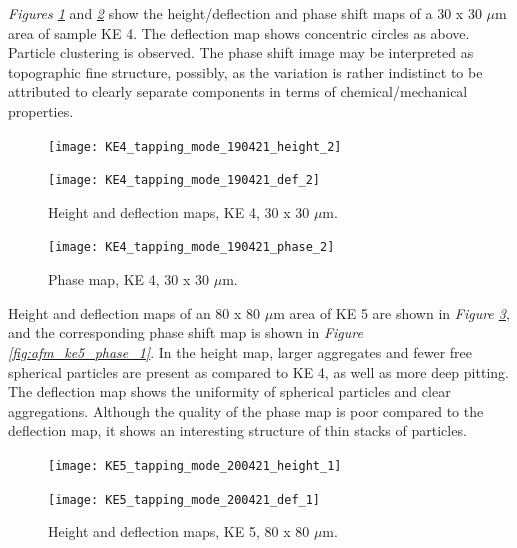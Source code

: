 \textit{Figures \ref{fig:afm_ke4_height_def_3}} and \textit{\ref{fig:afm_ke4_phase_3}} show the height/deflection and phase shift maps of a 30 x 30 $\mu$m area of sample KE 4. The deflection map shows concentric circles as above. Particle clustering is observed. The phase shift image may be interpreted as topographic fine structure, possibly, as the variation is rather indistinct to be attributed to clearly separate components in terms of chemical/mechanical properties.

\begin{figure}[H]
\centering
\begin{minipage}{.45\textwidth}
  \centering
  \texttt{[image: KE4\_tapping\_mode\_190421\_height\_2]}
\end{minipage}
\begin{minipage}{.45\textwidth}
  \centering
  \texttt{[image: KE4\_tapping\_mode\_190421\_def\_2]}
\end{minipage}
\caption[Height and deflection maps, KE 4]{Height and deflection maps, KE 4, 30 x 30 $\mu$m.}
\label{fig:afm_ke4_height_def_3}
\end{figure}

\begin{figure}[H]
\centering
  \texttt{[image: KE4\_tapping\_mode\_190421\_phase\_2]}
\caption[Phase map, KE 4]{Phase map, KE 4, 30 x 30 $\mu$m.}
\label{fig:afm_ke4_phase_3}
\end{figure}


Height and deflection maps of an 80 x 80 $\mu$m area of KE 5 are shown in \textit{Figure \ref{fig:afm_ke5_height_def_1}}, and the corresponding phase shift map is shown in \textit{Figure \ref{fig:afm_ke5_phase_1}}. In the height map, larger aggregates and fewer free spherical particles are present as compared to KE 4, as well as more deep pitting. The deflection map shows the uniformity of spherical particles and clear aggregations. Although the quality of the phase map is poor compared to the deflection map, it shows an interesting structure of thin stacks of particles.

\begin{figure}[H]
\centering
\begin{minipage}{.45\textwidth}
  \centering
  \texttt{[image: KE5\_tapping\_mode\_200421\_height\_1]}
\end{minipage}
\begin{minipage}{.45\textwidth}
  \centering
  \texttt{[image: KE5\_tapping\_mode\_200421\_def\_1]}
\end{minipage}
\caption[Height and deflection maps, KE 5]{Height and deflection maps, KE 5, 80 x 80 $\mu$m.}
\label{fig:afm_ke5_height_def_1}
\end{figure}

